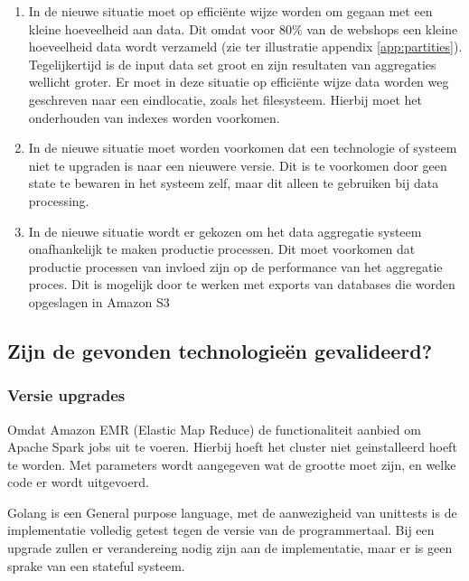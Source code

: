 \begin{enumerate}[label=(\alph*)]
    \item In de nieuwe situatie moet op efficiënte wijze worden om gegaan met een kleine hoeveelheid aan data. Dit omdat voor 80\% van de webshops een kleine hoeveelheid data wordt verzameld (zie ter illustratie appendix \ref{app:partities}). Tegelijkertijd is de input data set groot en zijn resultaten van aggregaties wellicht groter. Er moet in deze situatie op efficiënte wijze data worden weg geschreven naar een eindlocatie,  zoals het filesysteem. Hierbij moet het onderhouden van indexes worden voorkomen.
    
    \item In de nieuwe situatie moet worden voorkomen dat een technologie of systeem niet te upgraden is naar een nieuwere versie. Dit is te voorkomen door geen state te bewaren in het systeem zelf, maar dit alleen te gebruiken bij data processing.
    
    \item In de nieuwe situatie wordt er gekozen om het data aggregatie systeem onafhankelijk te maken productie processen. Dit moet voorkomen dat productie processen van invloed zijn op de performance van het aggregatie proces. Dit is mogelijk door te werken met exports van databases die worden opgeslagen in Amazon S3
\end{enumerate}

\clearpage


\subsection{Zijn de gevonden technologieën gevalideerd?}
\label{subsec:deelvraag3_vergelijking}

\subsubsection{\textbf{Versie upgrades}}

Omdat Amazon  EMR (Elastic Map Reduce) de functionaliteit aanbied om Apache Spark jobs uit te voeren. Hierbij hoeft het cluster niet geinstalleerd hoeft te worden. Met parameters wordt aangegeven wat de grootte moet zijn, en welke code er wordt uitgevoerd. 

Golang is een General purpose language, met de aanwezigheid van unittests is de implementatie volledig getest tegen de versie van de programmertaal. Bij een upgrade zullen er verandereing nodig zijn aan de implementatie, maar er is geen sprake van een stateful systeem.

